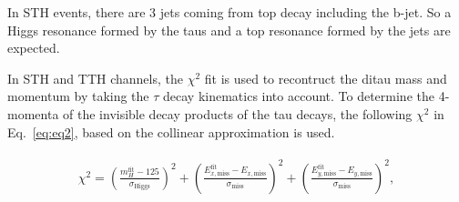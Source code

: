 In STH events, there are 3 jets coming from top decay including the b-jet. So a Higgs resonance formed by the taus and a top resonance formed by the jets are expected.

In STH and TTH channels, the $\chi^2$ fit
is used to recontruct the ditau mass and momentum by taking the $\tau$ decay kinematics into account. To determine the 4-momenta of the invisible decay products of the tau decays, the following $\chi^2$ in Eq.~\ref{eq:eq2}, based on the collinear approximation is used.

\begin{eqnarray}
\begin{array}{ll}
\chi^2 = 
\left( \frac{m_{H}^{\text{fit}} - 125}{\sigma_{\text{Higgs}}} \right)^2 + \left( \frac{E_{x,\text{miss}}^{\text{fit}} - E_{x,\text{miss}}}{\sigma_{\text{miss}}} \right)^2 + \left( \frac{E_{y,\text{miss}}^{\text{fit}} - E_{y,\text{miss}}}{\sigma_{\text{miss}}} \right)^2 ,
\end{array}
\label{eq:eq2}
\end{eqnarray}

%

